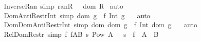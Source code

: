 \begin{isabellebody}
\isamarkupfalse%
%
\endisatagproof
{\isafoldproof}%
%
\isadelimproof
\isanewline
%
\endisadelimproof
\isanewline
{}\isamarkupfalse%
\ Inverse{\isacharunderscore}Ran\ {\isacharbrackleft}simp{\isacharbrackright}{\isacharcolon}\ {\isachardoublequoteopen}ran{\isacharparenleft}R\ {\isacharpercent}{\isachartilde}{\isacharparenright}\ {\isacharequal}\ dom\ {\isacharparenleft}R{\isacharparenright}{\isachardoublequoteclose}\isanewline
%
\isadelimproof
%
\endisadelimproof
%
\isatagproof
{}\isamarkupfalse%
\ auto\isanewline
{}\isamarkupfalse%
%
\endisatagproof
{\isafoldproof}%
%
\isadelimproof
\isanewline
%
\endisadelimproof
\isanewline
{}\isamarkupfalse%
\ Dom{\isacharunderscore}Anti{\isacharunderscore}Restr{\isacharunderscore}Int\ {\isacharbrackleft}simp{\isacharbrackright}{\isacharcolon}\ {\isachardoublequoteopen}{\isacharparenleft}{\isacharparenleft}{\isacharparenleft}dom\ g{\isacharparenright}\ {\isacharless}{\isacharminus}{\isacharcolon}\ f{\isacharparenright}\ Int\ g{\isacharparenright}\ {\isacharequal}\ {\isacharbraceleft}{\isacharbraceright}{\isachardoublequoteclose}\isanewline
%
\isadelimproof
%
\endisadelimproof
%
\isatagproof
{}\isamarkupfalse%
\ auto\isanewline
{}\isamarkupfalse%
%
\endisatagproof
{\isafoldproof}%
%
\isadelimproof
\isanewline
%
\endisadelimproof
\isanewline
{}\isamarkupfalse%
\ Dom{\isacharunderscore}Dom{\isacharunderscore}Anti{\isacharunderscore}Restr{\isacharunderscore}Int\ {\isacharbrackleft}simp{\isacharbrackright}{\isacharcolon}\ {\isachardoublequoteopen}{\isacharparenleft}{\isacharparenleft}dom\ {\isacharparenleft}{\isacharparenleft}dom\ g{\isacharparenright}\ {\isacharless}{\isacharminus}{\isacharcolon}\ f{\isacharparenright}{\isacharparenright}\ Int\ {\isacharparenleft}dom\ g{\isacharparenright}{\isacharparenright}\ {\isacharequal}\ {\isacharbraceleft}{\isacharbraceright}{\isachardoublequoteclose}\isanewline
%
\isadelimproof
%
\endisadelimproof
%
\isatagproof
{}\isamarkupfalse%
\ auto\isanewline
{}\isamarkupfalse%
%
\endisatagproof
{\isafoldproof}%
%
\isadelimproof
\isanewline
%
\endisadelimproof
\isanewline
{}\isamarkupfalse%
\ Rel{\isacharunderscore}Dom{\isacharunderscore}Restr\ {\isacharbrackleft}simp{\isacharbrackright}{\isacharcolon}\ {\isachardoublequoteopen}{\isacharbang}{\isacharbang}f{\isachardot}\ {\isacharbrackleft}{\isacharbar}f{\isacharcolon}{\isacharparenleft}A{\isacharless}{\isacharminus}{\isacharminus}{\isachargreater}B{\isacharparenright}{\isacharsemicolon}\ s{\isacharcolon}\ {\isacharparenleft}Pow\ A{\isacharparenright}\ {\isacharbar}{\isacharbrackright}\ {\isacharequal}{\isacharequal}{\isachargreater}\ {\isacharparenleft}{\isacharparenleft}s\ {\isacharless}{\isacharcolon}\ f{\isacharparenright}\ {\isacharcolon}\ {\isacharparenleft}A\ {\isacharless}{\isacharminus}{\isacharminus}{\isachargreater}\ B{\isacharparenright}{\isacharparenright}{\isachardoublequoteclose}\isanewline

\end{isabellebody}
